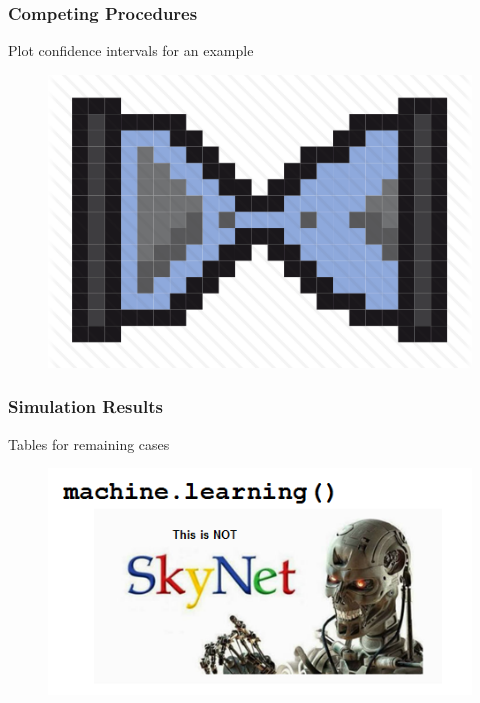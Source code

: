 \documentclass{beamer}
\begin{document}
\begin{frame}
\frametitle{Competing Procedures}

Plot confidence intervals for an example
\begin{figure}
    \includegraphics[scale =  0.5 ]{Figs/hourglass_icon_2.png}
\end{figure}

\end{frame}



\begin{frame}
\frametitle{Simulation Results}

Tables for remaining cases
\begin{figure}
    \includegraphics[scale =  0.75 ]{Figs/ThisIsNotSkyNetLogo.png}
\end{figure}

\end{frame}


\end{document}
